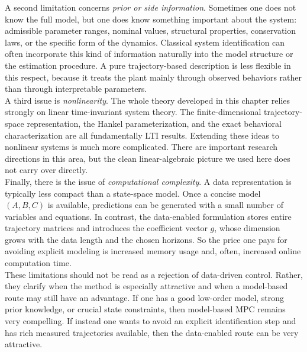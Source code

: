 A second limitation concerns \emph{prior or side information}. Sometimes one does not know the full model, but one does know something important about the system: admissible parameter ranges, nominal values, structural properties, conservation laws, or the specific form of the dynamics. Classical system identification can often incorporate this kind of information naturally into the model structure or the estimation procedure. A pure trajectory-based description is less flexible in this respect, because it treats the plant mainly through observed behaviors rather than through interpretable parameters.\\

A third issue is \emph{nonlinearity}. The whole theory developed in this chapter relies strongly on linear time-invariant system theory. The finite-dimensional trajectory-space representation, the Hankel parameterization, and the exact behavioral characterization are all fundamentally LTI results. Extending these ideas to nonlinear systems is much more complicated. There are important research directions in this area, but the clean linear-algebraic picture we used here does not carry over directly.\\

Finally, there is the issue of \emph{computational complexity}. A data representation is typically less compact than a state-space model. Once a concise model \((A,B,C)\) is available, predictions can be generated with a small number of variables and equations. In contrast, the data-enabled formulation stores entire trajectory matrices and introduces the coefficient vector \(g\), whose dimension grows with the data length and the chosen horizons. So the price one pays for avoiding explicit modeling is increased memory usage and, often, increased online computation time.\\
These limitations should not be read as a rejection of data-driven control. Rather, they clarify when the method is especially attractive and when a model-based route may still have an advantage. If one has a good low-order model, strong prior knowledge, or crucial state constraints, then model-based MPC remains very compelling. If instead one wants to avoid an explicit identification step and has rich measured trajectories available, then the data-enabled route can be very attractive.\\
